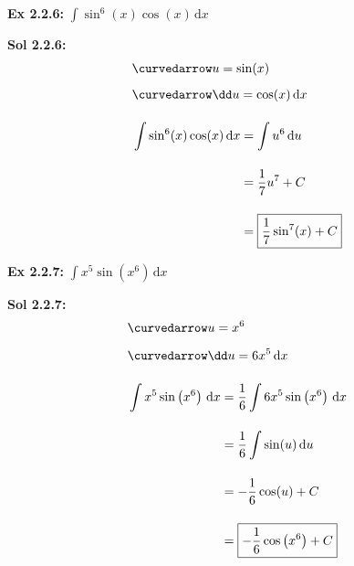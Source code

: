 \begin{tcolorbox}[example]
    \textbf{Ex 2.2.6: } $\int \sin^6 (x)\cos (x) \,\mathrm{d}x$
\end{tcolorbox}
\begin{tcolorbox}[solution]
    \textbf{Sol 2.2.6: }\begin{align*}
        & \curvedarrow u = \sin (x) \\[5.5pt]
        & \curvedarrow \dd u = \cos (x) \,\mathrm{d}x \\[11pt]
        & \int \sin^6 (x)\cos (x) \,\mathrm{d}x \begin{aligned}[t]
            & = \int u^6 \,\mathrm{d}u \\[11pt]
            & = \dfrac{1}{7}u^7 + C \\[11pt]
            & = \boxed{\dfrac{1}{7}\sin^7 (x) + C}
        \end{aligned}
    \end{align*}
\end{tcolorbox} \vspace{11pt}

\begin{tcolorbox}[example]
    \textbf{Ex 2.2.7: } $\int x^5\sin \left(x^6\right) \,\mathrm{d}x$ 
\end{tcolorbox}
\begin{tcolorbox}[solution]
    \textbf{Sol 2.2.7: } \begin{align*}
        & \curvedarrow u = x^6 \\[5.5pt]
        & \curvedarrow \dd u = 6x^5 \,\mathrm{d}x \\[11pt]
        & \int x^5\sin \left(x^6\right) \,\mathrm{d}x \begin{aligned}[t]
            & = \dfrac{1}{6}\int 6x^5\sin \left(x^6\right) \,\mathrm{d}x \\[11pt]
            & = \dfrac{1}{6}\int \sin (u) \,\mathrm{d}u \\[11pt]
            & = -\dfrac{1}{6}\cos (u) + C \\[11pt]
            & = \boxed{-\dfrac{1}{6}\cos \left(x^6\right) + C}
        \end{aligned}
    \end{align*}
\end{tcolorbox} \vspace{11pt}

